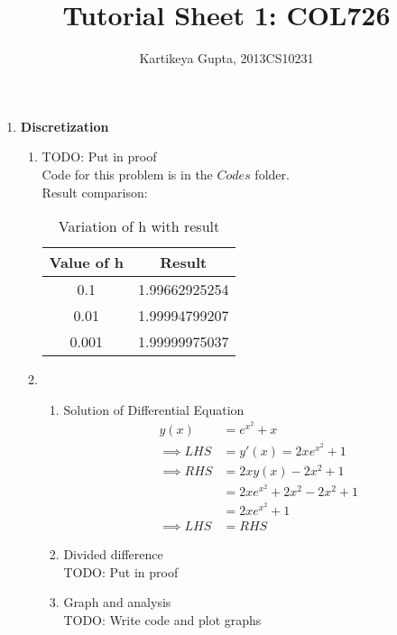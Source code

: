 \documentclass[11pt]{article}
\begin{document}
\author{Kartikeya Gupta, 2013CS10231}
\title{Tutorial Sheet 1: COL726}
\maketitle

\begin{enumerate}
		\item \textbf {Discretization} \\
		\begin{enumerate}
				\item %
						TODO: Put in proof \\
						Code for this problem is in the $Codes$ folder. \\
						Result comparison: \\
						\begin{table}[!htb]
						\centering
						\caption{Variation of h with result}
						\label{my-label}
						\begin{tabular}{|c|c|}
						\hline
						Value of h & Result        \\ \hline
						0.1        & 1.99662925254 \\ \hline
						0.01       & 1.99994799207 \\ \hline
						0.001      & 1.99999975037 \\ \hline
						\end{tabular}
						\end{table}	%
				\item %
						\begin{enumerate}
								\item Solution of Differential Equation
									\begin{align*}
										y(x) &= e^{x^{2}} + x \\
											\implies LHS &= y'(x) = 2xe^{x^{2}} + 1 \\
											\implies RHS &= 2xy(x)-2x^2 + 1 \\
															&= 2xe^{x^{2}} +2x^2 -2x^2 +1 \\
													  &= 2xe^{x^{2}}+1 \\
											\implies LHS &= RHS
									\end{align*}
								\item Divided difference \\ 
										TODO: Put in proof
								\item Graph and analysis \\
										TODO: Write code and plot graphs

\end{enumerate}
\end{enumerate}
\end{enumerate}
\end{document}
